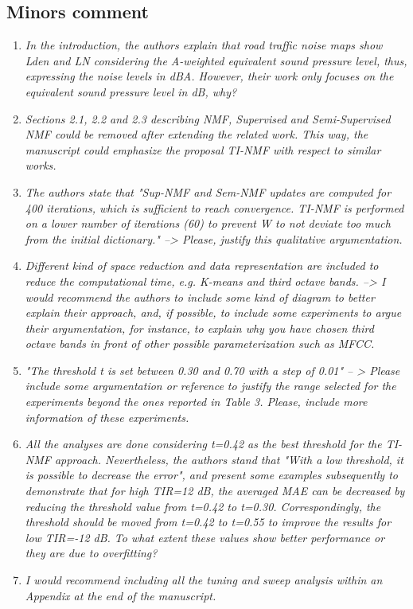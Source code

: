 \documentclass[10pt]{article}
\begin{document}
\subsection{Minors comment}

\begin{enumerate}
\item \emph{In the introduction, the authors explain that road traffic noise maps show Lden and LN considering the A-weighted equivalent sound pressure level, thus, expressing the noise levels in dBA. However, their work only focuses on the equivalent sound pressure level in dB, why? }

\item \emph{Sections 2.1, 2.2 and 2.3 describing NMF, Supervised and Semi-Supervised NMF could be removed after extending the related work. This way, the manuscript could emphasize the proposal TI-NMF with respect to similar works.}

\item \emph{The authors state that "Sup-NMF and Sem-NMF updates are computed for 400 iterations, which is sufficient to reach convergence. TI-NMF is performed on a lower number of iterations (60) to prevent W to not deviate too much from the initial dictionary." --> Please, justify this qualitative argumentation.}

\item \emph{Different kind of space reduction and data representation are included to reduce the computational time, e.g. K-means and third octave bands. --> I would recommend the authors to include some kind of diagram to better explain their approach, and, if possible, to include some experiments to argue their argumentation, for instance, to explain why you have chosen third octave bands in front of other possible parameterization such as MFCC.}

\item \emph{"The threshold t is set between 0.30 and 0.70 with a step of 0.01" -- > Please include some argumentation or reference to justify the range selected for the experiments beyond the ones reported in Table 3. Please, include more information of these experiments.}

\item \emph{All the analyses are done considering t=0.42 as the best threshold for the TI-NMF approach. Nevertheless, the authors stand that "With a low threshold, it is possible to decrease the error", and present some examples subsequently to demonstrate that for high TIR=12 dB, the averaged MAE can be decreased by reducing the threshold value from t=0.42 to t=0.30. Correspondingly, the threshold should be moved from t=0.42 to t=0.55 to improve the results for low TIR=-12 dB. To what extent these values show better performance or they are due to overfitting?}

\item \emph{I would recommend including all the tuning and sweep analysis within an Appendix at the end of the manuscript.}

\end{enumerate}
\end{document}
